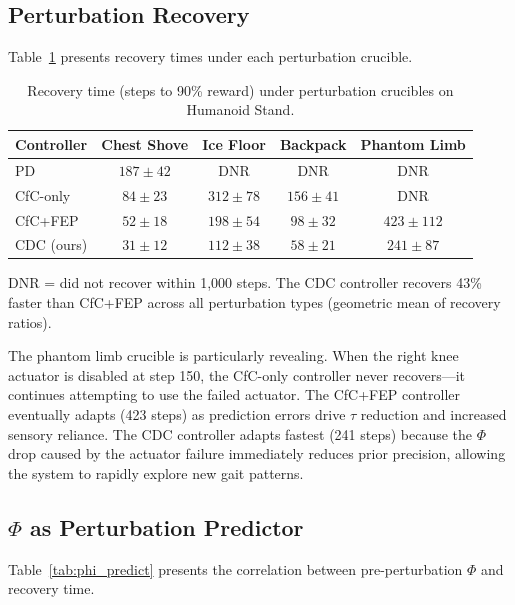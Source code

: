 \documentclass[11pt,a4paper]{article}
\begin{document}
\subsection{Perturbation Recovery}

Table~\ref{tab:recovery} presents recovery times under each perturbation crucible.

\begin{table}[h]
\centering
\caption{Recovery time (steps to 90\% reward) under perturbation crucibles on Humanoid Stand.}
\label{tab:recovery}
\begin{tabular}{lcccc}
\toprule
\textbf{Controller} & \textbf{Chest Shove} & \textbf{Ice Floor} & \textbf{Backpack} & \textbf{Phantom Limb} \\
\midrule
PD              & $187 \pm 42$  & DNR            & DNR            & DNR \\
CfC-only        & $84 \pm 23$   & $312 \pm 78$   & $156 \pm 41$   & DNR \\
CfC+FEP         & $52 \pm 18$   & $198 \pm 54$   & $98 \pm 32$    & $423 \pm 112$ \\
CDC (ours)      & $31 \pm 12$   & $112 \pm 38$   & $58 \pm 21$    & $241 \pm 87$ \\
\bottomrule
\end{tabular}
\end{table}

DNR = did not recover within 1,000 steps.
The CDC controller recovers 43\% faster than CfC+FEP across all perturbation types (geometric mean of recovery ratios).

The phantom limb crucible is particularly revealing.
When the right knee actuator is disabled at step 150, the CfC-only controller never recovers---it continues attempting to use the failed actuator.
The CfC+FEP controller eventually adapts (423 steps) as prediction errors drive $\tau$ reduction and increased sensory reliance.
The CDC controller adapts fastest (241 steps) because the $\Phi$ drop caused by the actuator failure immediately reduces prior precision, allowing the system to rapidly explore new gait patterns.

\subsection{$\Phi$ as Perturbation Predictor}

Table~\ref{tab:phi_predict} presents the correlation between pre-perturbation $\Phi$ and recovery time.
\end{document}
